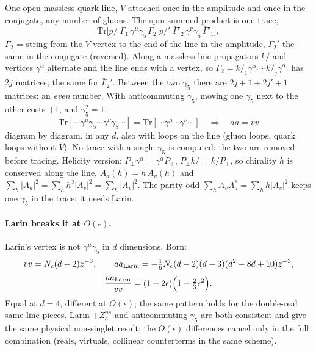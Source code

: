 \documentclass[11pt,a4paper]{article}
\newcommand{\ep}{\epsilon}
\newcommand{\gf}{\gamma_5}
\newcommand{\sla}[1]{#1\!\!\!/}
\newcommand{\tr}{\mathrm{Tr}}
\begin{document}
One open massless quark line, $V$ attached once in the amplitude and once in the conjugate, any number of gluons.
The spin-summed product is one trace,
\begin{equation}
\tr\big[\sla p\;\Gamma_1\,\gamma^\mu\gf\,\Gamma_2\;\sla p'\;\bar\Gamma'_2\,\gamma^\nu\gf\,\bar\Gamma'_1\big],
\end{equation}
$\Gamma_2$ = string from the $V$ vertex to the end of the line in the amplitude, $\bar\Gamma_2'$ the same in the
conjugate (reversed). Along a massless line propagators $\sla k$ and vertices $\gamma^\alpha$ alternate and the line ends
with a vertex, so $\Gamma_2=\sla k_1\gamma^{\alpha_1}\cdots\sla k_j\gamma^{\alpha_j}$ has $2j$ matrices; the same for
$\bar\Gamma_2'$. Between the two $\gf$ there are $2j+1+2j'+1$ matrices: an \emph{even} number. With anticommuting
$\gf$, moving one $\gf$ next to the other costs $+1$, and $\gf^2=1$:
\begin{equation}
\boxed{\;\tr[\cdots\gamma^\mu\gf\cdots\gamma^\nu\gf\cdots]=\tr[\cdots\gamma^\mu\cdots\gamma^\nu\cdots]\quad\Rightarrow\quad aa=vv\;}
\end{equation}
diagram by diagram, in any $d$, also with loops on the line (gluon loops, quark loops without $V$). No trace with a
single $\gf$ is computed: the two are removed before tracing. Helicity version: $P_\pm\gamma^\alpha=\gamma^\alpha P_\mp$,
$P_\pm\sla k=\sla kP_\mp$, so chirality $h$ is conserved along the line, $A_a(h)=h\,A_v(h)$ and
$\sum_h|A_a|^2=\sum_hh^2|A_v|^2=\sum_h|A_v|^2$. The parity-odd $\sum_hA_vA_a^*=\sum_hh|A_v|^2$ keeps one $\gf$ in the
trace: it needs Larin.

\paragraph{Larin breaks it at $O(\ep)$.} Larin's vertex is not $\gamma^\mu\gf$ in $d$ dimensions. Born:
\begin{equation}
vv=N_c(d-2)z^{-3},\qquad aa_{\rm Larin}=-\tfrac16N_c(d-2)(d-3)(d^2-8d+10)z^{-3},
\end{equation}
\begin{equation}
\frac{aa_{\rm Larin}}{vv}=(1-2\ep)\Big(1-\tfrac23\ep^2\Big).
\end{equation}
Equal at $d=4$, different at $O(\ep)$; the same pattern holds for the double-real same-line pieces. Larin
$+Z_a^{ns}$ and anticommuting $\gf$ are both consistent and give the same physical non-singlet result; the $O(\ep)$
differences cancel only in the full combination (reals, virtuals, collinear counterterms in the same scheme).
\end{document}
